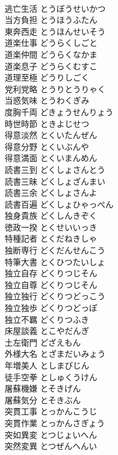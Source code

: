 \documentclass[8pt]{extreport}
\begin{document}
\begin{CJK}{UTF8}{min}
\\	逃亡生活	とうぼうせいかつ	
\\	当方負担	とうほうふたん	
\\	東奔西走	とうほんせいそう	
\\	道楽仕事	どうらくしごと	
\\	道楽仲間	どうらくなかま	
\\	道楽息子	どうらくむすこ	
\\	道理至極	どうりしごく	
\\	党利党略	とうりとうりゃく	
\\	当惑気味	とうわくぎみ	
\\	度胸千両	どきょうせんりょう	
\\	時世時節	ときよじせつ	
\\	得意淡然	とくいたんぜん	
\\	得意分野	とくいぶんや	
\\	得意満面	とくいまんめん	
\\	読書三到	どくしょさんとう	
\\	読書三昧	どくしょざんまい	
\\	読書三余	どくしょさんよ	
\\	読書百遍	どくしょひゃっぺん	
\\	独身貴族	どくしんきぞく	
\\	徳政一揆	とくせいいっき	
\\	特種記者	とくだねきしゃ	
\\	独断専行	どくだんせんこう	
\\	特筆大書	とくひつたいしょ	
\\	独立自存	どくりつじそん	
\\	独立自尊	どくりつじそん	
\\	独立独行	どくりつどっこう	
\\	独立独歩	どくりつどっぽ	
\\	独立不羈	どくりつふき	
\\	床屋談義	とこやだんぎ	
\\	土左衛門	どざえもん	
\\	外様大名	とざまだいみょう	
\\	年増美人	としまびじん	
\\	徒手空拳	としゅくうけん	
\\	屠蘇機嫌	とそきげん	
\\	屠蘇気分	とそきぶん	
\\	突貫工事	とっかんこうじ	
\\	突貫作業	とっかんさぎょう	
\\	突如異変	とつじょいへん	
\\	突然変異	とつぜんへんい	

\end{CJK}
\end{document}
